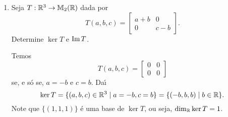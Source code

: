 \begin{exemplos}
	\begin{enumerate}
		\item Seja $T : \mathbb{R}^3 \to \mathbb{M}_2(\mathbb{R})$ dada por
		\[
			T(a,b,c) = \begin{bmatrix}
				a + b & 0\\
				0 & c - b
			\end{bmatrix}.
		\]
		Determine $\ker T$ e ${\rm Im\,} T$.
		\begin{solucao}
			Temos
			\[
				T(a,b,c) = \begin{bmatrix}
					0 & 0\\
					0 & 0
				\end{bmatrix}
			\]
			se, e s\'o se, $a = -b$ e $c = b$. Da{\'\i}
			\[
				\ker T = \{(a,b,c) \in \mathbb{R}^3 \mid a = -b, c = b\} = \{(-b,b,b) \mid b \in \mathbb{R}\}.
			\]
			Note que $\{(1,1,1)\}$ \'e uma base de $\ker T$, ou seja, $\dim_{\mathbb{R}} \ker T = 1$.


\end{solucao}
\end{enumerate}
\end{exemplos}
